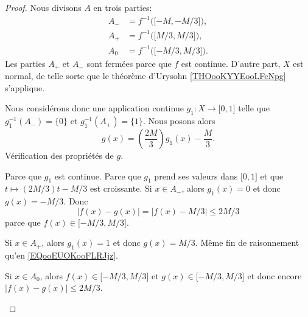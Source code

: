 \begin{proof}
	Nous divisons \( A\) en trois parties:
	\begin{subequations}
		\begin{align}
			A_- & =f^{-1}\big( \mathopen[ -M , -M/3 \mathclose] \big),  \\
			A_+ & =f^{-1}\big( \mathopen[ M/3 , M/3 \mathclose] \big),  \\
			A_0 & =f^{-1}\big( \mathopen[ -M/3 , M/3 \mathclose] \big).
		\end{align}
	\end{subequations}
	Les parties \( A_+\) et \( A_-\) sont fermées parce que \( f\) est continue. D'autre part, \( X\) est normal, de telle sorte que le théorème d'Urysohn \ref{THOooKYYEooLFcNpg} s'applique.

	Nous considérons donc une application continue \( g_1\colon X\to \mathopen[ 0 , 1 \mathclose]\) telle que \( g_1^{-1}(A_-)=\{ 0 \}\) et \( g_1^{-1}(A_+)=\{ 1 \}\). Nous posons alors
	\begin{equation}
		g(x)=\left( \frac{ 2M }{ 3 } \right)g_1(x)-\frac{ M }{ 3 }.
	\end{equation}
	Vérification des propriétés de \( g\).
	\begin{subproof}
		Parce que \( g_1\) est continue.
		Parce que \( g_1\) prend ses valeurs dans \( \mathopen[ 0 , 1 \mathclose]\) et que \( t\mapsto (2M/3)t-M/3\) est croissante.
		\spitem[\( | f(x)-g(x) |\) sur \( A\)]
		Si \( x\in A_-\), alors \( g_1(x)=0\) et donc \( g(x)=-M/3\). Donc
		\begin{equation}        \label{EQooEUOKooFLRJjz}
			| f(x)-g(x) |=| f(x)-M/3 |\leq 2M/3
		\end{equation}
		parce que \( f(x)\in \mathopen[ -M/3 , M/3 \mathclose]\).

		Si \( x\in A_+\), alors \( g_1(x)=1\) et donc \( g(x)=M/3\). Même fin de raisonnement qu'en \eqref{EQooEUOKooFLRJjz}.

		Si \( x\in A_0\), alors \( f(x)\in \mathopen[ -M/3 , M/3 \mathclose]\) et \( g(x)\in\mathopen[ -M/3 , M/3 \mathclose]\) et donc encore \( | f(x)-g(x) |\leq 2M/3\).
	\end{subproof}
\end{proof}

